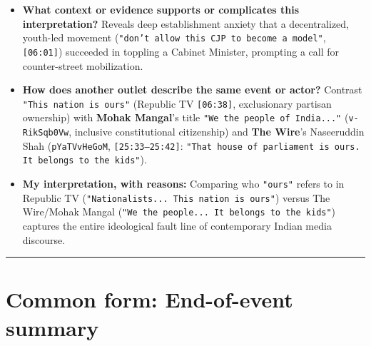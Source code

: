 \documentclass[10pt,a4paper]{article}
\begin{document}
\begin{itemize}[leftmargin=1.5em, itemsep=3pt, topsep=4pt]
  \item \textbf{What context or evidence supports or complicates this interpretation?} Reveals deep establishment anxiety that a decentralized, youth-led movement (\texttt{"don't allow this CJP to become a model"}, \texttt{[06:01]}) succeeded in toppling a Cabinet Minister, prompting a call for counter-street mobilization.
  \item \textbf{How does another outlet describe the same event or actor?} Contrast \texttt{"This nation is ours"} (Republic TV \texttt{[06:38]}, exclusionary partisan ownership) with \textbf{Mohak Mangal}'s title \texttt{"We the people of India..."} (\texttt{v-RikSqb0Vw}, inclusive constitutional citizenship) and \textbf{The Wire}'s Naseeruddin Shah (\texttt{pYaTVvHeGoM}, \texttt{[25:33--25:42]}: \texttt{"That house of parliament is ours. It belongs to the kids"}).
  \item \textbf{My interpretation, with reasons:} Comparing who \texttt{"ours"} refers to in Republic TV (\texttt{"Nationalists... This nation is ours"}) versus The Wire/Mohak Mangal (\texttt{"We the people... It belongs to the kids"}) captures the entire ideological fault line of contemporary Indian media discourse.
\end{itemize}
\vspace{4pt}\noindent\rule{\textwidth}{0.4pt}\vspace{4pt}

\section*{Common form: End-of-event summary}
\end{document}
